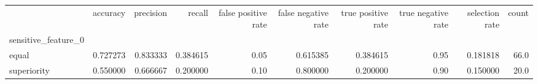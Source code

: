 \begin{tabular}{lrrrrrrrrr}
\toprule
{} &  accuracy &  precision &    recall &  false positive rate &  false negative rate &  true positive rate &  true negative rate &  selection rate &  count \\
sensitive\_feature\_0 &           &            &           &                      &                      &                     &                     &                 &        \\
\midrule
equal               &  0.727273 &   0.833333 &  0.384615 &                 0.05 &             0.615385 &            0.384615 &                0.95 &        0.181818 &   66.0 \\
superiority         &  0.550000 &   0.666667 &  0.200000 &                 0.10 &             0.800000 &            0.200000 &                0.90 &        0.150000 &   20.0 \\
\bottomrule
\end{tabular}
